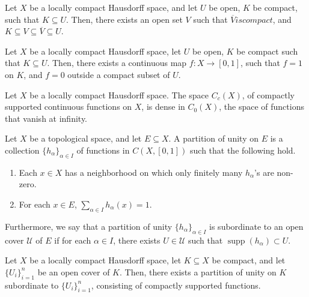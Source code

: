 \documentclass[11pt]{article}
\DeclareMathOperator{\supp}{supp}
\theoremstyle{definition}
\theoremstyle{remark}
\begin{document}
    \begin{lemma}
        Let $X$ be a locally compact Hausdorff space, and let $U$ be open, $K$ be
        compact, such that $K \subseteq U$. Then, there exists an open set $V$ such
        that $\overline{V} is compact$, and $K \subseteq V \subseteq \overline{V}
        \subseteq U$.
    \end{lemma}


    \begin{lemma}[Urysohn]
        Let $X$ be a locally compact Hausdorff space, let $U$ be open, $K$ be compact
        such that $K \subseteq U$. Then, there exists a continuous map $f\colon X \to
        [0, 1]$, such that $f = 1$ on $K$, and $f = 0$ outside a compact subset of
        $U$.
    \end{lemma}

    \begin{lemma}
        Let $X$ be a locally compact Hausdorff space. The space $C_c(X)$, of
        compactly supported continuous functions on $X$, is dense in $C_0(X)$, the
        space of functions that vanish at infinity.
    \end{lemma}

    \begin{definition}
        Let $X$ be a topological space, and let $E \subseteq X$. A partition of unity
        on $E$ is a collection $\{h_\alpha\}_{\alpha \in I}$ of functions in $C(X,
        [0, 1])$ such that the following hold. \begin{enumerate}
            \item Each $x \in X$ has a neighborhood on which only finitely many
            $h_\alpha$'s are non-zero.
            \item For each $x \in E$, $\sum_{\alpha \in I} h_\alpha(x) = 1$.
        \end{enumerate}
        Furthermore, we say that a partition of unity $\{h_\alpha\}_{\alpha \in I}$
        is subordinate to an open cover $\mathscr{U}$ of $E$ if for each $\alpha \in
        I$, there exists $U \in \mathscr{U}$ such that $\supp(h_\alpha) \subset U$.
    \end{definition}

    \begin{lemma}
        Let $X$ be a locally compact Hausdorff space, let $K \subseteq X$ be compact,
        and let $\{U_i\}_{i = 1}^n$ be an open cover of $K$. Then, there exists a
        partition of unity on $K$ subordinate to $\{U_i\}_{i = 1}^n$, consisting of
        compactly supported functions.
    \end{lemma}
\end{document}
